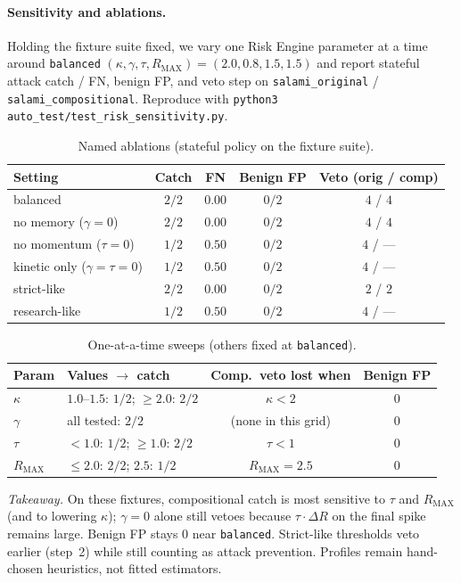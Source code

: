 
\paragraph{Sensitivity and ablations.}
Holding the fixture suite fixed, we vary one Risk Engine parameter at a time around
\texttt{balanced} $(\kappa,\gamma,\tau,R_{\mathrm{MAX}})=(2.0,0.8,1.5,1.5)$ and report
stateful attack catch / FN, benign FP, and veto step on \texttt{salami\_original} /
\texttt{salami\_compositional}.
Reproduce with \texttt{python3 auto\_test/test\_risk\_sensitivity.py}.

\begin{table}[h]
\centering
\caption{Named ablations (stateful policy on the fixture suite).}
\label{tab:ablations}
\small
\begin{tabular}{lcccc}
\toprule
\textbf{Setting} & \textbf{Catch} & \textbf{FN} & \textbf{Benign FP} & \textbf{Veto (orig / comp)} \\
\midrule
balanced & $2/2$ & $0.00$ & $0/2$ & $4$ / $4$ \\
no memory ($\gamma{=}0$) & $2/2$ & $0.00$ & $0/2$ & $4$ / $4$ \\
no momentum ($\tau{=}0$) & $1/2$ & $0.50$ & $0/2$ & $4$ / --- \\
kinetic only ($\gamma{=}\tau{=}0$) & $1/2$ & $0.50$ & $0/2$ & $4$ / --- \\
strict-like & $2/2$ & $0.00$ & $0/2$ & $2$ / $2$ \\
research-like & $1/2$ & $0.50$ & $0/2$ & $4$ / --- \\
\bottomrule
\end{tabular}
\end{table}

\begin{table}[h]
\centering
\caption{One-at-a-time sweeps (others fixed at \texttt{balanced}).}
\label{tab:sweeps}
\small
\begin{tabular}{llcc}
\toprule
\textbf{Param} & \textbf{Values $\rightarrow$ catch} & \textbf{Comp.\ veto lost when} & \textbf{Benign FP} \\
\midrule
$\kappa$ & $1.0$--$1.5$: $1/2$; $\ge 2.0$: $2/2$ & $\kappa < 2$ & $0$ \\
$\gamma$ & all tested: $2/2$ & (none in this grid) & $0$ \\
$\tau$ & $<1.0$: $1/2$; $\ge 1.0$: $2/2$ & $\tau < 1$ & $0$ \\
$R_{\mathrm{MAX}}$ & $\le 2.0$: $2/2$; $2.5$: $1/2$ & $R_{\mathrm{MAX}}=2.5$ & $0$ \\
\bottomrule
\end{tabular}
\end{table}

\noindent\textit{Takeaway.}
On these fixtures, compositional catch is most sensitive to $\tau$ and $R_{\mathrm{MAX}}$
(and to lowering $\kappa$); $\gamma{=}0$ alone still vetoes because $\tau\cdot\Delta R$
on the final spike remains large.
Benign FP stays $0$ near \texttt{balanced}.
Strict-like thresholds veto earlier (step~2) while still counting as attack prevention.
Profiles remain hand-chosen heuristics, not fitted estimators.
